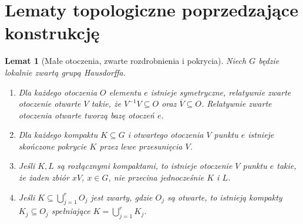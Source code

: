 \documentclass[11pt,a4paper,oneside]{book}
\numberwithin{equation}{chapter}
\theoremstyle{plain}
\newtheorem{lemat}[twierdzenie]{Lemat}
\theoremstyle{definition}
\theoremstyle{remark}
\begin{document}
\section{Lematy topologiczne poprzedzające konstrukcję}
\begin{lemat}[Małe otoczenia, zwarte rozdrobnienia i pokrycia]
\label{lem:haar-neigh-23}
Niech $G$ będzie lokalnie zwartą grupą Hausdorffa.
\begin{enumerate}[label=(\roman*)]
\item Dla każdego otoczenia $O$ elementu $e$ istnieje symetryczne,
  relatywnie zwarte otoczenie otwarte $V$ takie, że
  $V^{-1}V\subseteq O$ oraz $\overline V\subseteq O$.
  Relatywnie zwarte otoczenia otwarte
  tworzą bazę otoczeń $e$.
\item Dla każdego kompaktu $K\subseteq G$ i otwartego otoczenia
  $V$ punktu $e$ istnieje skończone pokrycie $K$
  przez lewe przesunięcia $V$.
\item Jeśli $K,L$ są rozłącznymi kompaktami, to istnieje otoczenie
  $V$ punktu $e$ takie, że żaden zbiór $xV$, $x\in G$,
  nie przecina jednocześnie $K$ i $L$.
\item Jeśli $K\subseteq\bigcup_{j=1}^r O_j$ jest zwarty,
  gdzie $O_j$ są otwarte, to istnieją kompakty
  $K_j\subseteq O_j$ spełniające $K=\bigcup_{j=1}^rK_j$.
\end{enumerate}
\end{lemat}
\end{document}

